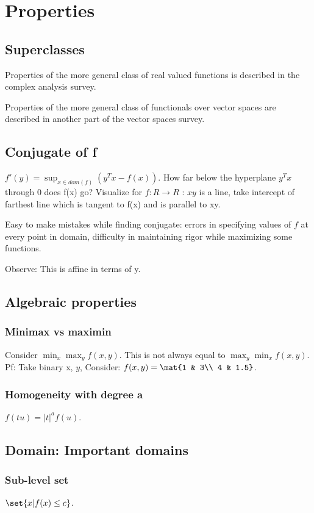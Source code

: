 \documentclass[oneside, article]{memoir}
\begin{document}
\section{Properties}
\subsection{Superclasses}
Properties of the more general class of real valued functions is described in the complex analysis survey.

Properties of the more general class of functionals over vector spaces are described in another part of the vector spaces survey.

\subsection{Conjugate of f}
$f'(y) = \sup_{x \in dom(f)} (y^{T}x - f(x))$. How far below the hyperplane $y^{T}x$ through 0 does f(x) go? Visualize for $f:R \to R$ : $xy$ is a line, take intercept of farthest line which is tangent to f(x) and is parallel to xy.

Easy to make mistakes while finding conjugate: errors in specifying values of $f$ at every point in domain, difficulty in maintaining rigor while maximizing some functions.

Observe: This is affine in terms of y.

\subsection{Algebraic properties}
\subsubsection{Minimax vs maximin}
Consider $\min_x \max_y f(x, y)$. This is not always equal to $\max_y \min_x f(x, y)$. Pf: Take binary x, $y$, Consider: $f(x, y) = \mat{1 & 3\\ 4 & 1.5}$.

\subsubsection{Homogeneity with degree a}
$f(tu) = |t|^{a}f(u)$.

\subsection{Domain: Important domains}
\subsubsection{Sub-level set}
$\set{x | f(x) \leq c}$.
\end{document}
